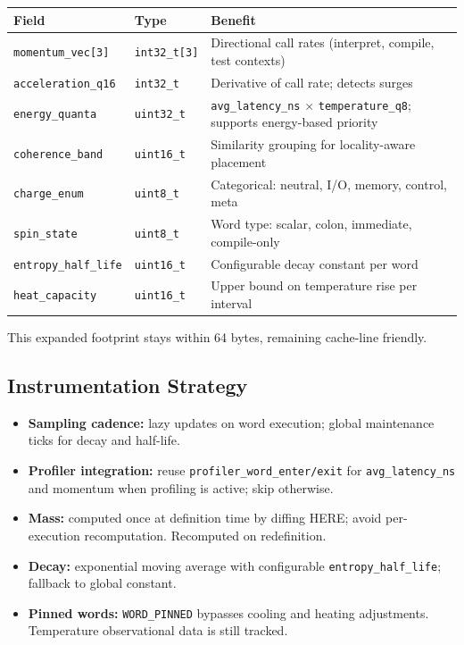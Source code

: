 \begin{center}
\begin{tabular}{llp{5.5cm}}
\toprule
Field & Type & Benefit \\
\midrule
\texttt{momentum\_vec[3]}  & \texttt{int32\_t[3]} & Directional call rates (interpret, compile, test contexts) \\
\texttt{acceleration\_q16} & \texttt{int32\_t}    & Derivative of call rate; detects surges \\
\texttt{energy\_quanta}    & \texttt{uint32\_t}   & \texttt{avg\_latency\_ns} $\times$ \texttt{temperature\_q8}; supports energy-based priority \\
\texttt{coherence\_band}   & \texttt{uint16\_t}   & Similarity grouping for locality-aware placement \\
\texttt{charge\_enum}      & \texttt{uint8\_t}    & Categorical: neutral, I/O, memory, control, meta \\
\texttt{spin\_state}       & \texttt{uint8\_t}    & Word type: scalar, colon, immediate, compile-only \\
\texttt{entropy\_half\_life} & \texttt{uint16\_t} & Configurable decay constant per word \\
\texttt{heat\_capacity}    & \texttt{uint16\_t}   & Upper bound on temperature rise per interval \\
\bottomrule
\end{tabular}
\end{center}

This expanded footprint stays within 64 bytes, remaining cache-line friendly.

\subsection{Instrumentation Strategy}

\begin{itemize}
  \item \textbf{Sampling cadence:} lazy updates on word execution; global
        maintenance ticks for decay and half-life.
  \item \textbf{Profiler integration:} reuse \texttt{profiler\_word\_enter/exit}
        for \texttt{avg\_latency\_ns} and momentum when profiling is active;
        skip otherwise.
  \item \textbf{Mass:} computed once at definition time by diffing HERE;
        avoid per-execution recomputation. Recomputed on redefinition.
  \item \textbf{Decay:} exponential moving average with configurable
        \texttt{entropy\_half\_life}; fallback to global constant.
  \item \textbf{Pinned words:} \texttt{WORD\_PINNED} bypasses cooling and
        heating adjustments. Temperature observational data is still tracked.
\end{itemize}


